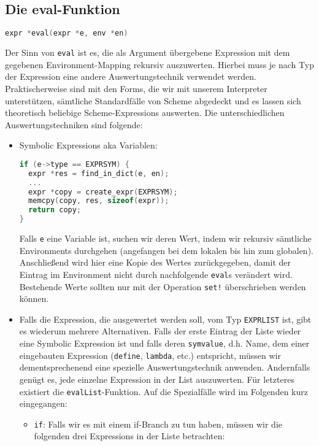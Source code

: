 \subsection[eval]{Die eval-Funktion}
\begin{lstlisting}[language=C]
expr *eval(expr *e, env *en)
\end{lstlisting}
Der Sinn von \texttt{eval} ist es, die als Argument übergebene Expression mit
dem gegebenen Environment-Mapping rekursiv auszuwerten. Hierbei muss je nach
Typ der Expression eine andere Auswertungstechnik verwendet werden.
Praktischerweise sind mit den Forms, die wir mit unserem Interpreter 
unterstützen, sämtliche Standardfälle von Scheme abgedeckt und es lassen sich
theoretisch beliebige Scheme-Expressions auswerten.
\pre
Die unterschiedlichen Auswertungstechniken sind folgende:
\begin{itemize}
  \item Symbolic Expressions aka Variablen:
    \begin{lstlisting}[language=C]
if (e->type == EXPRSYM) {
  expr *res = find_in_dict(e, en);
  ...
  expr *copy = create_expr(EXPRSYM);
  memcpy(copy, res, sizeof(expr));
  return copy;
}
    \end{lstlisting}
    Falls \texttt{e} eine Variable ist, suchen wir deren Wert, indem wir
    rekursiv sämtliche Environments durchgehen (angefangen bei dem lokalen bis
    hin zum globalen). Anschließend wird hier eine Kopie des Wertes
    zurückgegeben, damit der Eintrag im Environment nicht durch nachfolgende
    \texttt{eval}s verändert wird. Bestehende Werte sollten nur mit der
    Operation \texttt{set!} überschrieben werden können.
  \item Falls die Expression, die ausgewertet werden soll, vom Typ
    \texttt{EXPRLIST} ist, gibt es wiederum mehrere Alternativen. Falls der
    erste Eintrag der Liste wieder eine Symbolic Expression ist und falls
    deren \texttt{symvalue}, d.h. Name, dem einer eingebauten Expression
    (\texttt{define}, \texttt{lambda}, etc.) entspricht, müssen wir
    dementsprechenend eine spezielle Auswertungstechnik anwenden. Andernfalls
    genügt es, jede einzelne Expression in der List auszuwerten. Für letzteres
    existiert die \texttt{evalList}-Funktion. Auf die Spezialfälle wird im
    Folgenden kurz eingegangen:
    \begin{itemize}
        \item \texttt{if}: Falls wir es mit einem if-Branch zu tun haben,
          müssen wir die folgenden drei Expressions in der Liste betrachten:

\end{itemize}
\end{itemize}
